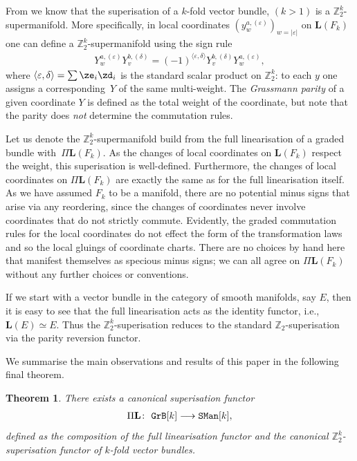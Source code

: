 \documentclass[pdftex]{sigma}
\newcommand{\ep}{\varepsilon}
\newcommand{\catname}[1]{\textnormal{\texttt{#1}}}
\def\Linr{{\mathbf{L}}} %
\numberwithin{equation}{section}
\newtheorem{Theorem}{Theorem}[section]
\begin{document}
From \cite[Proposition~5.5]{Covolo:2014a} we know that the superisation of a $k$-fold vector bundle, $(k >1)$ is a $ \mathbb{Z}_{2}^k$-supermanifold.
More specif\/ically, in local coordinates $(y^{a, (\ep)}_w)_{w=|\ep|}$ on $\Linr(F_{k})$ one can def\/ine a $\mathbb{Z}_{2}^{k}$-supermanifold using the sign rule
\begin{gather*}
Y^{a, (\ep)}_w Y^{b, (\delta)}_v = (-1)^{\langle \ep , \delta \rangle}Y^{b, (\delta)}_v Y^{a, (\ep)}_w,
\end{gather*}
where $\langle \ep , \delta \rangle=\sum\ze_i\zd_i$ is the standard scalar product on $\mathbb{Z}_{2}^{k}$: to each $y$ one assigns a correspon\-ding~$Y$ of the same multi-weight. The \emph{Grassmann parity} of a given coordinate $Y$ is def\/ined as the total weight of the coordinate, but note that the parity does \emph{not} determine the commutation rules.

Let us denote the $\mathbb{Z}_{2}^{k}$-supermanifold build from the full linearisation of a graded bundle with~$\Pi \Linr(F_{k})$. As the changes of local coordinates on $\Linr(F_{k})$ respect the weight, this superisation is well-def\/ined. Furthermore, the changes of local coordinates on $\Pi \Linr(F_{k})$ are exactly the same as for the full linearisation itself. As we have assumed $F_{k}$ to be a manifold, there are no potential minus signs that arise via any reordering, since the changes of coordinates never involve coordinates that do not strictly commute. Evidently, the graded commutation rules for the local coordinates do not ef\/fect the form of the transformation laws and so the local gluings of coordinate charts. There are no choices by hand here that manifest themselves as specious minus signs; we can all agree on $\Pi \Linr(F_{k})$ without any further choices or conventions.

If we start with a vector bundle in the category of smooth manifolds, say $E$, then it is easy to see that the full linearisation acts as the identity functor, i.e., $\Linr(E) \simeq E$. Thus the $\mathbb{Z}_{2}^{k}$-superisation reduces to the standard $\mathbb{Z}_{2}$-superisation via the parity reversion functor.

We summarise the main observations and results of this paper in the following f\/inal theorem.

\begin{Theorem}\label{thm:superisation}
There exists a canonical superisation functor
\begin{gather*}\Pi \Linr\colon \ \catname{GrB}[k] \longrightarrow \catname{SMan}[k], \end{gather*}
defined as the composition of the full linearisation functor and the canonical $\mathbb{Z}_2^k$-superisation functor of $k$-fold vector bundles.
\end{Theorem}
\end{document}
